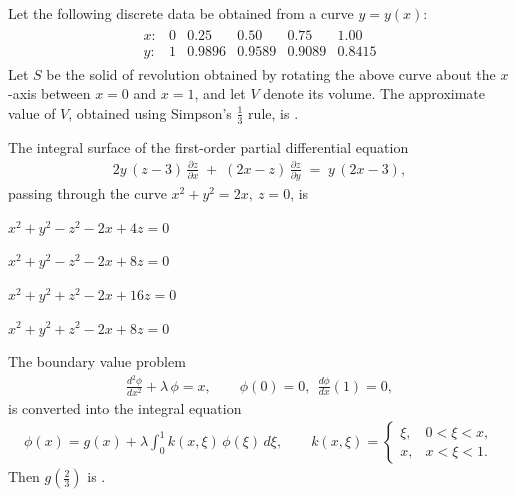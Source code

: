\documentclass[journal,12pt,onecolumn]{IEEEtran}
\theoremstyle{remark}
\begin{document}
\begin{enumerate}
{\hfill{}

\item Let the following discrete data be obtained from a curve \(y=y(x)\):
\begin{align*}
\begin{array}{c|ccccc}
x: & 0 & 0.25 & 0.50 & 0.75 & 1.00\\ \hline
y: & 1 & 0.9896 & 0.9589 & 0.9089 & 0.8415
\end{array}
\end{align*}
Let \(S\) be the solid of revolution obtained by rotating the above curve about the
\(x\)-axis between \(x=0\) and \(x=1\), and let \(V\) denote its volume. The approximate value of \(V\),
obtained using Simpson's \(\tfrac{1}{3}\) rule, is \underline{\hspace{3.2cm}}.

\hfill{}

\item The integral surface of the first-order partial differential equation
\begin{align*}
2y\,(z-3)\,\frac{\partial z}{\partial x}
\;+\;
(2x-z)\,\frac{\partial z}{\partial y}
\;=\;
y\,(2x-3),
\end{align*}
passing through the curve \(x^{2}+y^{2}=2x,\ z=0\), is

\hfill{}

\begin{enumerate}[label=\Alph*.,itemsep=.3\baselineskip]
\begin{multicols}{2}
\item \(x^{2}+y^{2}-z^{2}-2x+4z=0\)
\item \(x^{2}+y^{2}-z^{2}-2x+8z=0\)
\item \(x^{2}+y^{2}+z^{2}-2x+16z=0\)
\item \(x^{2}+y^{2}+z^{2}-2x+8z=0\)
\end{multicols}
\end{enumerate}
\newpage
\item The boundary value problem
\begin{align*}
\frac{d^{2}\phi}{dx^{2}}+\lambda\,\phi=x,\qquad 
\phi(0)=0,\ \ \frac{d\phi}{dx}(1)=0,
\end{align*}
is converted into the integral equation
\begin{align*}
\phi(x)=g(x)+\lambda\!\int_{0}^{1}\!k(x,\xi)\,\phi(\xi)\,d\xi,
\qquad 
k(x,\xi)=
\begin{cases}
\xi, & 0<\xi<x,\\
x, & x<\xi<1.
\end{cases}
\end{align*}
Then \(g\!\left(\tfrac{2}{3}\right)\) is \underline{\hspace{3cm}}.
\hfill{}

}
\end{enumerate}
\end{document}
